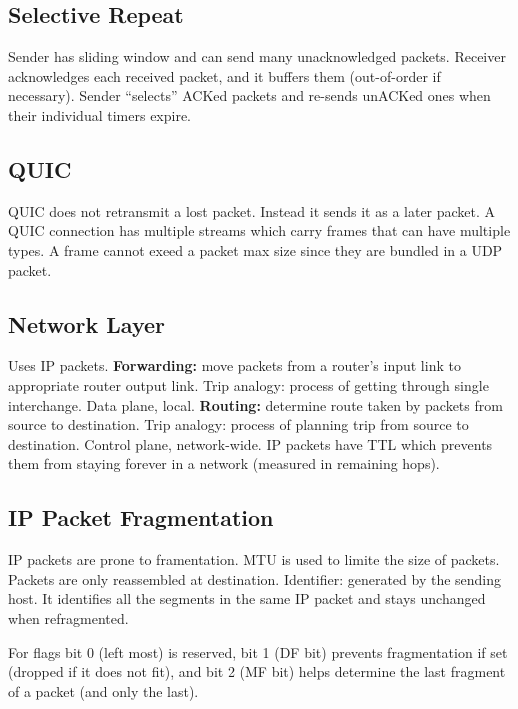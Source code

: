 \subsection{Selective Repeat}
Sender has sliding window and can send many unacknowledged packets.
Receiver acknowledges each received packet, and it buffers them
(out-of-order if necessary). Sender ``selects'' ACKed packets and
re-sends unACKed ones when their individual timers expire.
\subsection{QUIC}
QUIC does not retransmit a lost packet. Instead it sends it as a later
packet. A QUIC connection has multiple streams which carry frames that
can have multiple types. A frame cannot exeed a packet max size since
they are bundled in a UDP packet.
\subsection{Network Layer}
Uses IP packets. \textbf{Forwarding:} move packets from a router's input
link to appropriate router output link. Trip analogy: process of getting
through single interchange. Data plane, local. \textbf{Routing:}
determine route taken by packets from source to destination. Trip
analogy: process of planning trip from source to destination. Control
plane, network-wide. IP packets have TTL which prevents them from
staying forever in a network (measured in remaining hops).
\subsection{IP Packet Fragmentation}
IP packets are prone to framentation. MTU is used to limite the size of
packets. Packets are only reassembled at destination.
Identifier: generated by the sending host. It identifies all the
segments in the same IP packet and stays unchanged when refragmented.

For flags bit 0 (left most) is reserved, bit 1 (DF bit) prevents
fragmentation if set (dropped if it does not fit), and bit 2 (MF bit)
helps determine the last fragment of a packet (and only the last).

